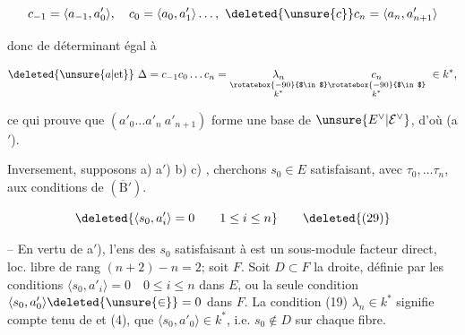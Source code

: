 
\[c_{-1}=\langle a_{-1},a'_0\rangle,\quad c_0=\langle a_0,a'_1\rangle\ldots,\ \deleted{\unsure{c}}c_n=\langle a_n,a'_{n+1}\rangle\]

donc de déterminant égal à

\[\deleted{\unsure{a|\text{et}}}\ \Delta=c_{-1}c_0\ldots c_n=\underset{\substack{\rotatebox{-90}{$\in$}\\ k^*}}{\lambda_n}\underset{\substack{\rotatebox{-90}{$\in$}\\ k^*}}{c_n}\ \in k^*,\]

ce qui prouve que  $(a'_0\ldots a'_n\ a'_{n+1})$ forme une base de $\unsure{E^\vee|\mathcal E^\vee}$, d'où (a$'$).

Inversement, supposons a) a$'$) b) c) , cherchons $s_0\in E$ satisfaisant, avec $\tau_0,\ldots\tau_n$, aux conditions de $(\overline{\mathrm B}')$. 



\[\deleted{\langle s_0,a'_i\rangle=0\qquad1\leq i\leq n}\tag*{\deleted{(29)}}\]

-- En vertu de a$'$), l'ens des $s_0$ satisfaisant à   est un sous-module facteur direct, loc. libre de rang $(n+2)-n=2$;   soit $F$.  Soit $D\subset F$ la droite, définie par les conditions $\langle s_0,a'_i\rangle=0\quad0\leq i\leq n$ dans $E$,  ou la seule condition $\langle s_0,a'_0\rangle\deleted{\unsure{\in}}=0$  dans $F$. La condition (19) $\lambda_n\in k^*$ signifie compte tenu de  et (4), que $\langle s_0,a'_0\rangle\in k^*$,  i.e. $s_0\notin D$ sur chaque fibre.

